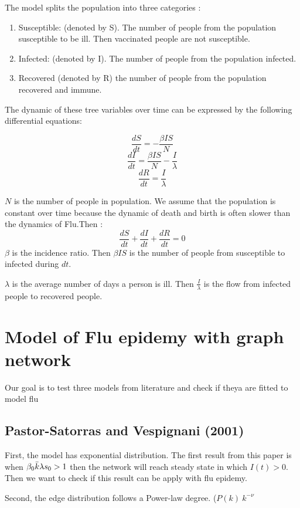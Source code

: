 The model splits the population into three categories : 
\begin{enumerate}
    \item Susceptible: (denoted by S). The number of people from the population susceptible to be ill. Then vaccinated people are not susceptible.
    \item Infected: (denoted by I). The number of people from the population infected.
    \item Recovered (denoted by R) the number of people from the population recovered and immune.
    
\end{enumerate}

The dynamic of these tree variables over time can be expressed by the following differential equations:

$${\frac  {dS}{dt}}=-{\frac  {\beta IS}{N}}$$
$${\frac  {dI}{dt}}={\frac  {\beta IS}{N}}-\frac{I}{\lambda}$$
$${\frac  {dR}{dt}}=\frac{I}{\lambda}$$

$N$ is the number of people in population. We assume that the population is constant over time because the dynamic of death and birth is often slower than the dynamics of Flu.Then :
$${\frac  {dS}{dt}}+{\frac  {dI}{dt}}+{\frac  {dR}{dt}}=0$$
$\beta$ is the incidence ratio. Then $\beta I S$ is the number of people from susceptible to infected during $dt$.

$\lambda$ is the average number of days a person is ill. Then $\frac{I}{\lambda}$ is the flow from infected people to recovered people.


\section{Model of Flu epidemy with graph network}

Our goal is to test three models from literature and check if theya are fitted to model flu

\subsection{Pastor-Satorras and Vespignani (2001) \cite{PhysRevLett.86.3200}}

First, the model has exponential distribution.
The first result from this paper is when $\beta_{0} \Bar{k} \lambda s_0>1$ then the network will reach steady state in which $I(t) > 0$. Then we want to check if this result can be apply with flu epidemy.

Second, the edge distribution follows a Power-law degree. ($P(k) ~ k^{-\nu}$

